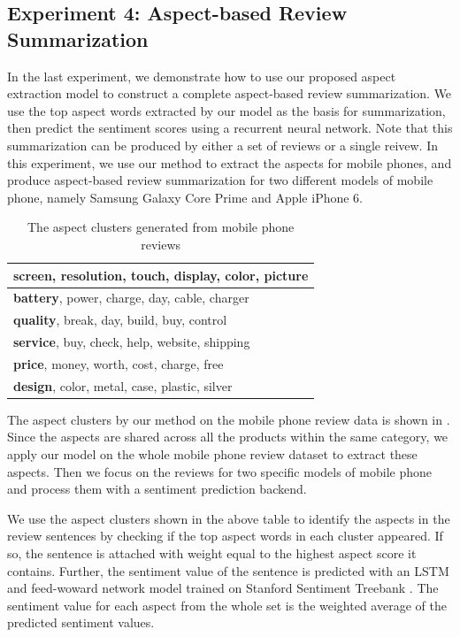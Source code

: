 \subsection{Experiment 4: Aspect-based Review Summarization}
\label{sec:exp4}

In the last experiment,
we demonstrate how to use our proposed aspect 
extraction model to construct a complete aspect-based review summarization. 
We use the top aspect words extracted by our model as the basis 
for summarization, then predict the sentiment scores using a recurrent 
neural network. Note that this summarization can be produced by 
either a set of reviews or a single reivew. In this experiment, 
we use our method to extract the aspects for mobile phones, 
and produce aspect-based review summarization for 
two different models of mobile phone, namely Samsung Galaxy Core Prime 
and Apple iPhone 6.

\begin{table}[th]
\centering
\caption{The aspect clusters generated from mobile phone reviews}
\label{table:clusters}
\begin{tabular}{|l|}
\hline
\textbf{screen}, resolution, touch, display, color, picture \\ \hline
\textbf{battery}, power, charge, day, cable, charger \\ \hline
\textbf{quality}, break, day, build, buy, control \\ \hline
\textbf{service}, buy, check, help, website, shipping \\ \hline
\textbf{price}, money, worth, cost, charge, free \\ \hline
\textbf{design}, color, metal, case, plastic, silver \\ \hline
\end{tabular}
\end{table}

The aspect clusters by our method on the mobile phone review data 
is shown in . Since the aspects are shared across 
all the products within the same category, 
we apply our model on the whole mobile 
phone review dataset to extract these aspects. 
Then we focus on the reviews for two specific models of mobile phone 
and process them with a sentiment prediction backend.

We use the aspect clusters shown in the above table to identify the 
aspects in the review sentences by checking if the top aspect words 
in each cluster appeared. If so, the sentence is attached with weight 
equal to the highest aspect score it contains. Further, the sentiment 
value of the sentence is predicted with an LSTM and feed-woward network 
model trained on Stanford Sentiment Treebank \cite{socher2013recursive}. 
The sentiment value for each aspect from the whole set is the 
weighted average of the predicted sentiment values.

